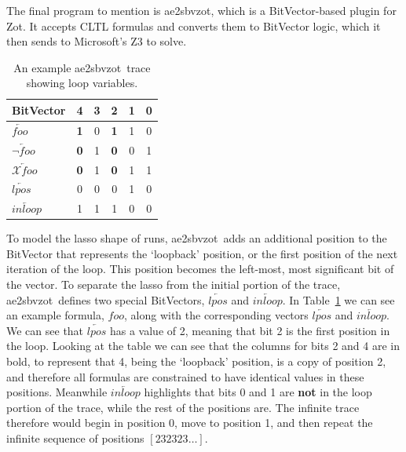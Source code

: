 \documentclass[a4paper,11pt]{report}
\theoremstyle{definition}
\newcommand{\aez}{ae2sbvzot}
\begin{document}
The final program to mention is \aez, which is a BitVector-based plugin for Zot.
It accepts CLTL formulas and converts them to BitVector logic, which it then
sends to Microsoft's Z3 to solve.

\begin{table}[hb]
  \centering
  \caption{An example \aez\ trace showing loop variables.}
  \begin{tabular}{l|c c c c c}
    BitVector & \textbf{4} & 3 & \textbf{2} & 1 & 0 \\
    \midrule
    \(\overleftarrow{foo}\)            & \textbf{1} & 0 & \textbf{1} & 1 & 0 \\
    \(\overleftarrow{\neg foo}\)       & \textbf{0} & 1 & \textbf{0} & 0 & 1 \\
    \(\overleftarrow{\mathcal{X}foo}\) & \textbf{0} & 1 & \textbf{0} & 1 & 1 \\

    \midrule
    \(\overleftarrow{lpos}\)           & 0 & 0 & 0 & 1 & 0 \\
    \(\overleftarrow{inloop}\)         & 1 & 1 & 1 & 0 & 0

  \end{tabular}
  \label{table:zotloop}
 \end{table}

To model the lasso shape of runs, \aez\ adds an additional position to the
BitVector that represents the `loopback' position, or the first position of the
next iteration of the loop. This position becomes the left-most, most
significant bit of the vector. To separate the lasso from the initial portion of
the trace, \aez\ defines two special BitVectors, \(\overleftarrow{lpos}\) and
\(\overleftarrow{inloop}\). In Table~\ref{table:zotloop} we can see an example formula,
\(foo\), along with the corresponding vectors \(\overleftarrow{lpos}\) and
\(\overleftarrow{inloop}\). We can see that \(\overleftarrow{lpos}\) has a value
of 2, meaning that bit 2 is the first position in the loop. Looking at the table
we can see that the columns for bits 2 and 4 are in bold, to represent that 4,
being the `loopback' position, is a copy of position 2, and therefore all
formulas are constrained to have identical values in these positions. Meanwhile
\(\overleftarrow{inloop}\) highlights that bits 0 and 1 are \textbf{not} in the
loop portion of the trace, while the rest of the positions are. The infinite
trace therefore would begin in position 0, move to position 1, and then repeat
the infinite sequence of positions \([232323\ldots]\).
\end{document}
